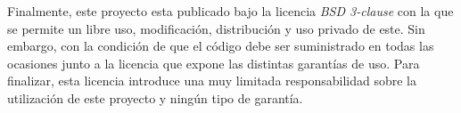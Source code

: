  Finalmente, este proyecto esta publicado bajo la licencia \textit{BSD 3-clause} con la que se permite un libre uso, modificación, distribución y uso privado de este. Sin embargo, con la condición de que el código debe ser suministrado en todas las ocasiones junto a la licencia que expone las distintas garantías de uso. Para finalizar, esta licencia introduce una muy limitada responsabilidad sobre la utilización de este proyecto y ningún tipo de garantía.